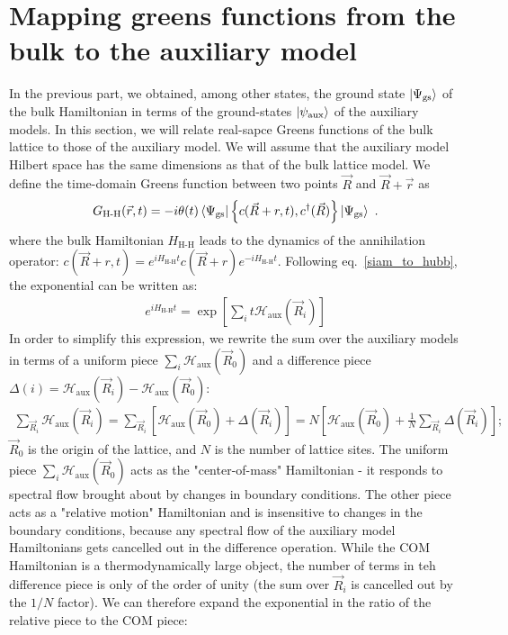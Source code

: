 \documentclass{report}
\numberwithin{equation}{section}
\begin{document}
\section{Mapping greens functions from the bulk to the auxiliary model}
In the previous part, we obtained, among other states, the ground state \(\ket{\Psi_\text{gs}}\) of the bulk Hamiltonian in terms of the ground-states \(\ket{\psi_\text{aux}}\) of the auxiliary models.
In this section, we will relate real-sapce Greens functions of the bulk lattice to those of the auxiliary model. We will assume that the auxiliary model Hilbert space has the same dimensions as that of the bulk lattice model.
We define the time-domain Greens function between two points \(\vec R\) and \(\vec R + \vec r\) as
\begin{equation}\begin{aligned}
	G_\text{H-H}(\vec r, t) = -i\theta(t) \braket{\Psi_\text{gs} | \left\{ c(\vec R + r,t), c^\dagger(\vec R) \right\} | \Psi_\text{gs}}~.
\end{aligned}\end{equation}
where the bulk Hamiltonian \(H_\text{H-H}\) leads to the dynamics of the annihilation operator: \(c(\vec R + r,t) = e^{i H_\text{H-H} t}c(\vec R + r)e^{-i H_\text{H-H} t}\). Following eq.~\ref{siam_to_hubb}, the exponential can be written as:
\begin{equation}\begin{aligned}
e^{i H_\text{H-H} t} = \exp\left[\sum_i t\mathcal{H}_\text{aux}(\vec R_i)\right] 
\end{aligned}\end{equation}
In order to simplify this expression, we rewrite the sum over the auxiliary models in terms of a uniform piece \(\sum_{i}\mathcal{H}_\text{aux}(\vec R_0)\) and a difference piece \(\Delta(i) = \mathcal{H}_\text{aux}(\vec R_i) - \mathcal{H}_\text{aux}(\vec R_0)\):
\begin{equation}\begin{aligned}
	\sum_{\vec R_i} \mathcal{H}_\text{aux}(\vec R_i) = \sum_{\vec R_i} \left[\mathcal{H}_\text{aux}(\vec R_0) + \Delta(\vec R_i)\right] = N \left[\mathcal{H}_\text{aux}(\vec R_0) + \frac{1}{N}\sum_{\vec R_i} \Delta(\vec R_i)\right];
\end{aligned}\end{equation}
\(\vec R_0\) is the origin of the lattice, and \(N\) is the number of lattice sites. The uniform piece \(\sum_{i}\mathcal{H}_\text{aux}(\vec R_0)\) acts as the "center-of-mass" Hamiltonian - it responds to spectral flow brought about by changes in boundary conditions. The other piece acts as a "relative motion" Hamiltonian and is insensitive to changes in the boundary conditions, because any spectral flow of the auxiliary model Hamiltonians gets cancelled out in the difference operation. While the COM Hamiltonian is a thermodynamically large object, the number of terms in teh difference piece is only of the order of unity (the sum over \(\vec R_i\) is cancelled out by the \(1/N\) factor). We can therefore expand the exponential in the ratio of the relative piece to the COM piece:
\end{document}
